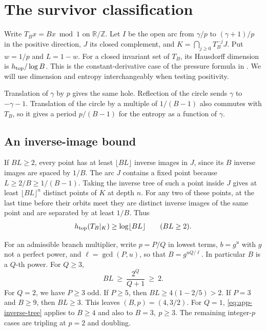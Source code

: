 \documentclass[11pt,reqno,a4paper]{amsart}
\theoremstyle{remark}
\begin{document}
\section{The survivor classification}\label{sec:classification}

Write \(T_B x=Bx\bmod 1\) on \(\mathbb R/\mathbb Z\). Let \(I\) be the
open arc from \(\gamma/p\) to \((\gamma+1)/p\) in the positive
direction, \(J\) its closed complement, and
\(K=\bigcap_{j\ge0}T_B^{-j}J\). Put \(w=1/p\) and \(L=1-w\).
For a closed invariant set of \(T_B\), its Hausdorff dimension is
\(h_{\rm top}/\log B\). This is the constant-derivative case of the
pressure formula in \cite[Theorem~3]{app-urbanski}. We will use dimension
and entropy interchangeably when testing positivity.

Translation of \(\gamma\) by \(p\) gives the same hole. Reflection of the
circle sends \(\gamma\) to \(-\gamma-1\). Translation of the circle by a
multiple of \(1/(B-1)\) also commutes with \(T_B\), so it gives a period
\(p/(B-1)\) for the entropy as a function of \(\gamma\).

\subsection{An inverse-image bound}

If \(BL\ge2\), every point has at least \(\lfloor BL\rfloor\) inverse
images in \(J\), since its \(B\) inverse images are spaced by \(1/B\).
The arc \(J\) contains a fixed point because
\(L\ge 2/B\ge1/(B-1)\). Taking the inverse tree of such a point inside
\(J\) gives at least \(\lfloor BL\rfloor^n\) distinct points of \(K\)
at depth \(n\). For any two of these points, at the last time before
their orbits meet they are distinct inverse images of the same point
and are separated by at least \(1/B\). Thus
\begin{equation}\label{eq:app-inverse-tree}
 h_{\rm top}(T_B|_K)\ge \log\lfloor BL\rfloor \qquad(BL\ge2).
\end{equation}

For an admissible branch multiplier, write \(p=P/Q\) in lowest terms,
\(b=g^u\) with \(g\) not a perfect power, and \(\ell=\gcd(P,u)\), so that
\(B=g^{uQ/\ell}\). In particular \(B\) is a \(Q\)-th power. For \(Q\ge3\),
\[
 BL\ \ge\ \frac{2^Q}{Q+1}\ \ge\ 2.
\]
For \(Q=2\), we have \(P\ge3\) odd. If \(P\ge5\), then
\(BL\ge4(1-2/5)>2\). If \(P=3\) and \(B\ge9\), then \(BL\ge3\).
This leaves \((B,p)=(4,3/2)\). For \(Q=1\), \eqref{eq:app-inverse-tree}
applies to \(B\ge4\) and also to \(B=3,\ p\ge3\). The remaining
integer-\(p\) cases are tripling at \(p=2\) and doubling.
\end{document}
